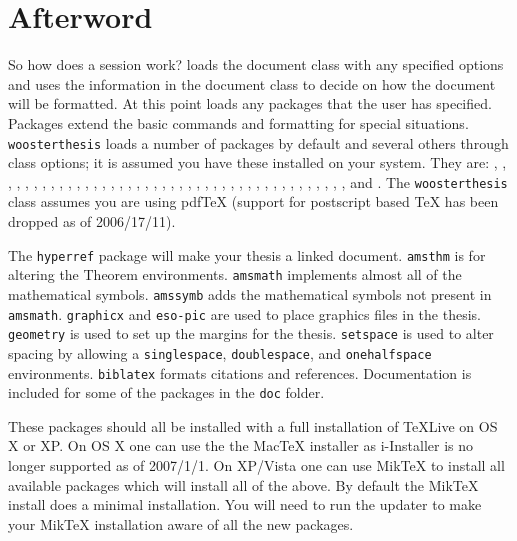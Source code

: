 \chapter*{Afterword}\label{after}
So how does a \lt session work? \lt loads the document class with any specified options and uses the information in the document class to decide on how the document will be formatted. At this point \lt loads any packages that the user has specified. Packages extend the basic \lt commands and formatting for special situations. \verb|woosterthesis| loads a number of packages by default and several others through class options; it is assumed you have these installed on your system. They are:
,
,
,
,
,
,
,
,
,
,
,
,
,
,
,
,
,
,
,
,
,
,
,
,
,
,
,
,
,
,
,
,
,
,
,
,
,
,
,
,
,
,
and .
The \texttt{woosterthesis} class assumes you are using pdfTeX (support for postscript based TeX has been dropped as of 2006/17/11).

The \texttt{hyperref} package will make your thesis a linked document. \texttt{amsthm} is for altering the Theorem environments. \texttt{amsmath} implements almost all of the mathematical symbols. \texttt{amssymb} adds the mathematical symbols not present in \texttt{amsmath}. \texttt{graphicx} and \texttt{eso-pic} are used to place graphics files in the thesis. \texttt{geometry} is used to set up the margins for the thesis. \texttt{setspace} is used to alter spacing by allowing a \texttt{singlespace}, \texttt{doublespace}, and \texttt{onehalfspace} environments. \texttt{biblatex} formats citations and references.  Documentation is included for some of the packages in the \verb|doc| folder.

These packages should all be installed with a full installation of TeXLive on OS X or XP. On OS X one can use the the MacTeX installer as i-Installer is no longer supported as of 2007/1/1. On XP/Vista one can use MikTeX to install all available packages which will install all of the above. By default the MikTeX install does a minimal installation. You will need to run the updater to make your MikTeX installation aware of all the new packages.


